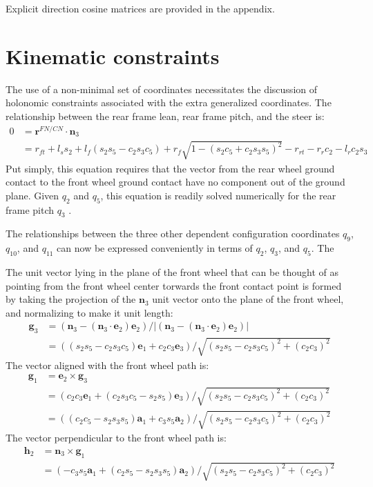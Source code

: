 \documentclass[letterpaper,11pt]{article}
\newcommand{\bs}[1]{ \boldsymbol{ #1 } }
\begin{document}
Explicit direction cosine matrices are provided in the
appendix.

\section*{Kinematic constraints}
The use of a non-minimal set of coordinates necessitates the discussion of
holonomic constraints associated with the extra generalized coordinates.  The
relationship between the rear frame lean, rear frame pitch, and the steer is:
\begin{align*}
0 & =  \bs{r}^{FN/CN} \cdot \bs{n}_3 \\
  & = r_{ft} + l_s s_2 + l_f (s_2 s_5 - c_2 s_3 c_5) +
    r_f \sqrt{1 - (s_2 c_5 + c_2 s_3 s_5)^2} - r_{rt} - r_r c_2 - l_r c_2 s_3
  \label{eq:holonomic}
\end{align*}
Put simply, this equation requires that the vector from the rear wheel ground
contact to the front wheel ground contact have no component out of the ground
plane.  Given $q_2$ and $q_5$, this equation is readily solved numerically for
the rear frame pitch $q_3$ \cite{Peterson2008a}.

The relationships between the three other dependent configuration coordinates
$q_9$, $q_{10}$, and $q_{11}$ can now be expressed conveniently in terms of
$q_2$, $q_3$, and $q_5$.  The

The unit vector lying in the plane of the front wheel that
can be thought of as pointing from the front wheel center torwards the front
contact point is formed by taking the projection of the $\bs{n}_3$ unit vector
onto the plane of the front wheel, and normalizing to make it unit length:
\begin{align*}
  \bs{g}_3 & = (\bs{n}_3 - (\bs{n}_3 \cdot \bs{e}_2) \bs{e}_2) / |(\bs{n}_3 -
  (\bs{n}_3 \cdot \bs{e}_2) \bs{e}_2)| \\
  & = ((s_2 s_5 - c_2 s_3 c_5) \bs{e}_1 + c_2 c_3 \bs{e}_3) / \sqrt{(s_2 s_5 -
  c_2 s_3 c_5)^2 + (c_2 c_3)^2}
\end{align*}
The vector aligned with the front wheel path is:
\begin{align*}
  \bs{g}_1 & = \bs{e}_2 \times \bs{g}_3 \\
  & = \left(c_2 c_3 \bs{e}_1 + (c_2 s_3 c_5 - s_2 s_5) \bs{e}_3\right) / \sqrt{(s_2 s_5 -
  c_2 s_3 c_5)^2 + (c_2 c_3)^2} \\
  & = \left((c_2 c_5 - s_2 s_3 s_5) \bs{a}_1 + c_3 s_5 \bs{a}_2\right) / \sqrt{(s_2 s_5 -
  c_2 s_3 c_5)^2 + (c_2 c_3)^2}
\end{align*}
The vector perpendicular to the front wheel path is:
\begin{align*}
  \bs{h}_2 & = \bs{n}_3 \times \bs{g}_1 \\
  & = \left(-c_3 s_5 \bs{a}_1 + (c_2 s_5 - s_2 s_3 s_5) \bs{a}_2\right) / \sqrt{(s_2 s_5 -
  c_2 s_3 c_5)^2 + (c_2 c_3)^2}
\end{align*}
\end{document}

